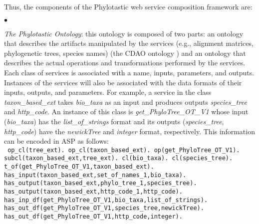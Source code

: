 \documentclass{new_tlp}
\begin{document}
Thus, the   components of the Phylotastic web service composition framework are:
\begin{list}{$\bullet$}{\itemsep=0pt \topsep=1pt \parsep=0pt \leftmargin=10pt} 

\item \emph{The Phylotastic Ontology}: this ontology is composed of
two parts: an ontology that describes the artifacts manipulated by the services (e.g., alignment matrices, phylogenetic trees, species names)  (the CDAO ontology \cite{cdao1}) and an 
ontology that describes the actual operations and transformations performed by the services.  Each class of services is associated with a name, inputs, parameters, and outputs. Instances of the services will also be associated with the data formats of their inputs, outputs, and parameters.  
For example, a service in the class \textit{taxon\_based\_ext} takes \textit{bio\_taxa} as an input and produces outputs \textit{species\_tree} and \textit{http\_code}. An instance of this class is \textit{get\_PhyloTree\_OT\_V1} whose input (\textit{bio\_taxa}) has the \textit{list\_of\_strings} format and its outputs (\textit{species\_tree}, \textit{http\_code}) have the \textit{newickTree} and \textit{integer} format, respectively. This information can be encoded in ASP as follows:\\
\texttt{\small
\hspace*{.5cm}op\_cl(tree\_ext). op\_cl(taxon\_based\_ext). op(get\_PhyloTree\_OT\_V1). \\
\hspace*{.5cm}subcl(taxon\_based\_ext,tree\_ext). cl(bio\_taxa). cl(species\_tree). \\
\hspace*{.5cm}t\_of(get\_PhyloTree\_OT\_V1,taxon\_based\_ext).\\
\hspace*{.5cm}has\_input(taxon\_based\_ext,set\_of\_names\_1,bio\_taxa). \\
\hspace*{.5cm}has\_output(taxon\_based\_ext,phylo\_tree\_1,species\_tree). \\
\hspace*{.5cm}has\_output(taxon\_based\_ext,http\_code\_1,http\_code).\\
\hspace*{.5cm}has\_inp\_df(get\_PhyloTree\_OT\_V1,bio\_taxa,list\_of\_strings). \\
\hspace*{.5cm}has\_out\_df(get\_PhyloTree\_OT\_V1,species\_tree,newickTree). \\
\hspace*{.5cm}has\_out\_df(get\_PhyloTree\_OT\_V1,http\_code,integer).
}



\end{list}
\end{document}
